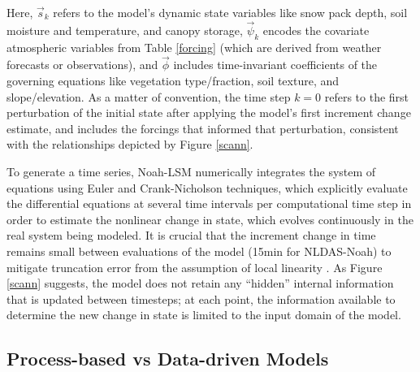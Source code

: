 Here, $\vec{s}_k$ refers to the model's dynamic state variables like snow pack depth, soil moisture and temperature, and canopy storage, $\vec{\psi}_k$ encodes the covariate atmospheric variables from Table \ref{forcing} (which are derived from weather forecasts or observations), and $\vec{\phi}$ includes time-invariant coefficients of the governing equations like vegetation type/fraction, soil texture, and slope/elevation. As a matter of convention, the time step $k=0$ refers to the first perturbation of the initial state after applying the model's first increment change estimate, and includes the forcings that informed that perturbation, consistent with the relationships depicted by Figure \ref{scann}.

To generate a time series, Noah-LSM numerically integrates the system of equations using Euler and Crank-Nicholson techniques, which explicitly evaluate the differential equations at several time intervals per computational time step in order to estimate the nonlinear change in state, which evolves continuously in the real system being modeled. It is crucial that the increment change in time remains small between evaluations of the model (15min for NLDAS-Noah) to mitigate truncation error from the assumption of local linearity \citep{mitchell_multi-institution_2004} \citep{cartwright_dynamics_1992}. As Figure \ref{scann} suggests, the model does not retain any ``hidden'' internal information that is updated between timesteps; at each point, the information available to determine the new change in state is limited to the input domain of the model.

\subsection{Process-based vs Data-driven Models}

